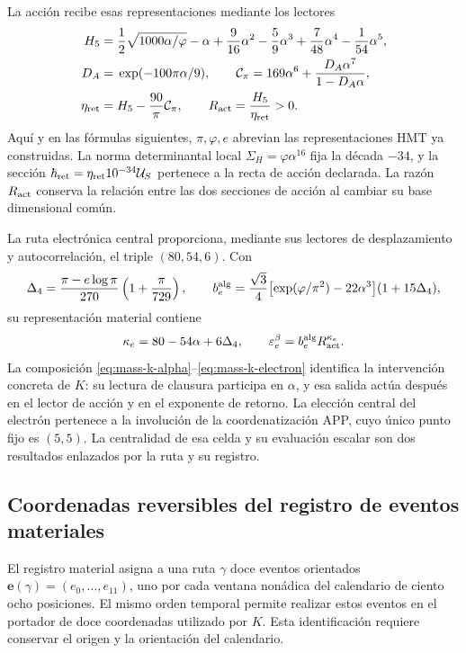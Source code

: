 La acción recibe esas representaciones mediante los lectores
\begin{align}
 H_5={}&\frac12\sqrt{1000\alpha/\varphi}-\alpha+
       \frac9{16}\alpha^2-\frac59\alpha^3+
       \frac7{48}\alpha^4-\frac1{54}\alpha^5,\notag\\
 D_A={}&\exp(-100\pi\alpha/9),\qquad
 \mathcal C_\pi=169\alpha^6+\frac{D_A\alpha^7}{1-D_A\alpha},\notag\\
 \eta_{\rm ret}={}&H_5-\frac{90}{\pi}\mathcal C_\pi,
 \qquad R_{\rm act}=\frac{H_5}{\eta_{\rm ret}}>0.
 \label{eq:mass-k-action}
\end{align}
Aquí y en las fórmulas siguientes, \(\pi,\varphi,e\) abrevian las
representaciones HMT ya construidas. La norma determinantal local
\(\Sigma_H=\varphi\alpha^{16}\) fija la década \(-34\), y la
sección \(\hbar_{\rm ret}=\eta_{\rm ret}10^{-34}\mathcal U_S\)
pertenece a la recta de acción declarada. La razón \(R_{\rm act}\)
conserva la relación entre las dos secciones de acción al cambiar su base
dimensional común.

La ruta electrónica central proporciona, mediante sus lectores de
desplazamiento y autocorrelación, el triple \((80,54,6)\). Con
\[
 \Delta_4=\frac{\pi-e\log\pi}{270}\left(1+\frac\pi{729}\right),
 \qquad
 b_e^{\rm alg}=\frac{\sqrt3}{4}
       \bigl[\exp(\varphi/\pi^2)-22\alpha^3\bigr](1+15\Delta_4),
\]
su representación material contiene
\begin{equation}
 \kappa_e=80-54\alpha+6\Delta_4,
 \qquad \varepsilon_e^\beta=b_e^{\rm alg}R_{\rm act}^{\kappa_e}.
 \label{eq:mass-k-electron}
\end{equation}
La composición \eqref{eq:mass-k-alpha}--\eqref{eq:mass-k-electron}
identifica la intervención concreta de \(K\): su lectura de clausura
participa en \(\alpha\), y esa salida actúa después en el lector de
acción y en el exponente de retorno. La elección central del electrón
pertenece a la involución de la coordenatización APP, cuyo único punto fijo es
\((5,5)\). La centralidad de esa celda y su evaluación escalar son
dos resultados enlazados por la ruta y su registro.

\subsection{Coordenadas reversibles del registro de eventos materiales}

El registro material asigna a una ruta \(\gamma\) doce eventos
orientados \(\mathbf e(\gamma)=(e_0,\ldots,e_{11})\), uno por cada
ventana nonádica del calendario de ciento ocho posiciones. El mismo
orden temporal permite realizar estos eventos en el portador de doce
coordenadas utilizado por \(K\). Esta identificación requiere conservar
el origen y la orientación del calendario.

